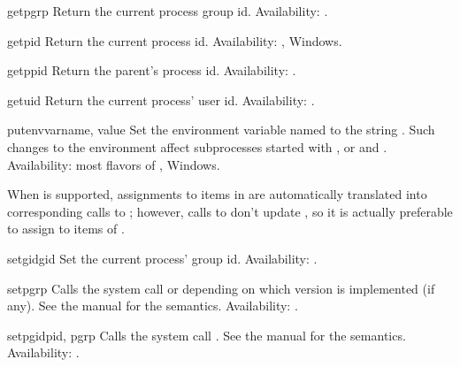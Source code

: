 \begin{funcdesc}{getpgrp}{}
Return the current process group id.
Availability: \UNIX{}.
\end{funcdesc}

\begin{funcdesc}{getpid}{}
Return the current process id.
Availability: \UNIX{}, Windows.
\end{funcdesc}

\begin{funcdesc}{getppid}{}
Return the parent's process id.
Availability: \UNIX{}.
\end{funcdesc}

\begin{funcdesc}{getuid}{}
Return the current process' user id.
Availability: \UNIX{}.
\end{funcdesc}

\begin{funcdesc}{putenv}{varname, value}
Set the environment variable named  to the string
.  Such changes to the environment affect subprocesses
started with ,  or
 and .
Availability: most flavors of \UNIX{}, Windows.

When  is
supported, assignments to items in  are automatically
translated into corresponding calls to ; however,
calls to  don't update , so it is
actually preferable to assign to items of .  
\end{funcdesc}

\begin{funcdesc}{setgid}{gid}
Set the current process' group id.
Availability: \UNIX{}.
\end{funcdesc}

\begin{funcdesc}{setpgrp}{}
Calls the system call  or  depending on which version is implemented (if any).  See the
\UNIX{} manual for the semantics.
Availability: \UNIX{}.
\end{funcdesc}

\begin{funcdesc}{setpgid}{pid, pgrp}
Calls the system call .  See the \UNIX{} manual
for the semantics.
Availability: \UNIX{}.
\end{funcdesc}

